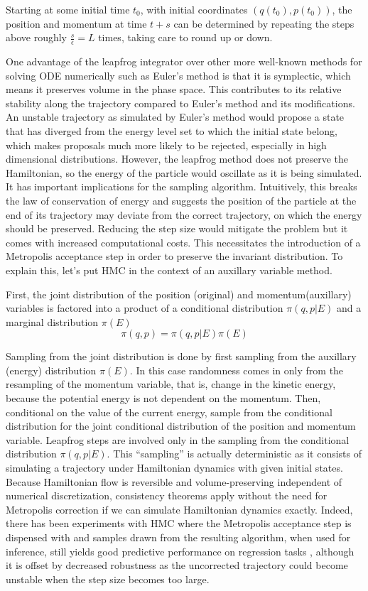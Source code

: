 \documentclass[]{report}
\begin{document}
Starting at some initial time $t_0$, with initial coordinates $(q(t_0),p(t_0))$, the position and momentum at time $t+s$ can be determined by repeating the steps above roughly $\frac{s}{\epsilon} = L$ times, taking care to round up or down. 

One advantage of the leapfrog integrator over other more well-known methods for
solving ODE numerically such as Euler's method is that it is symplectic, which
means it preserves volume in the phase space. This
contributes to its relative stability along the trajectory compared to Euler's
method and its modifications. An unstable trajectory as simulated by Euler's
method would propose a state that has diverged from the energy level set to
which the initial state belong, which makes proposals much more likely to be
rejected, especially in high dimensional distributions.  However,
the leapfrog method does not preserve the Hamiltonian, so the energy of the particle would
oscillate as it is being simulated. It has important implications for the
sampling algorithm. Intuitively, this breaks the law of conservation of energy
and suggests the position of the particle at the end of its trajectory may
deviate from the correct trajectory, on which the energy should be preserved.
Reducing the step size would mitigate the problem but it comes with increased
computational costs. This necessitates the introduction of a Metropolis
acceptance step in order to preserve the invariant distribution. To explain
this, let's put HMC in the context of an auxillary variable method. 

First, the joint distribution of the position (original) and momentum(auxillary)
variables is factored into a product of a conditional distribution $\pi(q,p|E)$ and a
marginal distribution $\pi(E)$
\[ \pi(q,p) = \pi(q,p|E)\pi(E) \]

Sampling from the joint distribution is done by first sampling from the
auxillary (energy) distribution $\pi(E)$. In this case randomness comes in only from the
resampling of the momentum variable, that is, change in the kinetic energy,
because the potential energy is not dependent on the momentum. Then, conditional on the value of the
current energy, sample from the conditional distribution for the joint
conditional distribution of the position and momentum variable. Leapfrog steps
are involved only in the sampling from the conditional distribution $\pi(q,p|E)$.
This ``sampling'' is actually deterministic as it consists of simulating a
trajectory under Hamiltonian dynamics with given initial states. Because
Hamiltonian flow is reversible and volume-preserving independent of numerical
discretization, consistency theorems apply without the need for Metropolis
correction if we can simulate Hamiltonian dynamics exactly. Indeed, there has
been experiments with HMC where the Metropolis acceptance step is dispensed with
and samples drawn from the resulting algorithm, when used for inference, still yields good predictive
performance on regression tasks \cite{neal1993bayesian}, although it is offset
by
decreased robustness as the uncorrected trajectory could become unstable when
the step size becomes too large.
\end{document}
